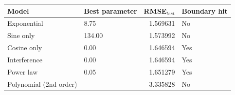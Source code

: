 \begin{tabular}{llrl}
\toprule
Model & Best parameter & RMSE$_{test}$ & Boundary hit \\
\midrule
Exponential & 8.75 & 1.569631 & No \\
Sine only & 134.00 & 1.573992 & No \\
Cosine only & 0.00 & 1.646594 & Yes \\
Interference & 0.00 & 1.646594 & Yes \\
Power law & 0.05 & 1.651279 & Yes \\
Polynomial (2nd order) & --- & 3.335828 & No \\
\bottomrule
\end{tabular}
